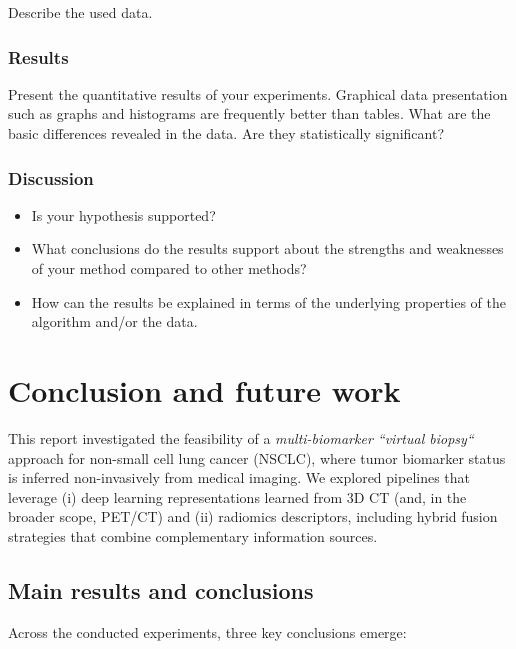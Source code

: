 \documentclass[twoside,runningheads,a4paper,11pt]{report}
\begin{document}
Describe the used data.

\subsection{Results}
\label{section:results}

Present the quantitative results of your experiments. Graphical data presentation such as graphs and histograms are frequently better than tables. What are the basic differences revealed in the data. Are they statistically significant?

\subsection{Discussion}
\label{section:discussion}

\begin{itemize}
	\item Is your hypothesis supported? 
	\item What conclusions do the results support about the strengths and weaknesses of your method compared to other methods? 
	\item How can the results be explained in terms of the underlying properties of the algorithm and/or the data. 
\end{itemize}



\chapter{Conclusion and future work}
\label{chapter:concl}

This report investigated the feasibility of a \textit{multi-biomarker ``virtual biopsy``} approach for non-small cell lung cancer (NSCLC), where tumor biomarker status is inferred non-invasively from medical imaging. We explored pipelines that leverage (i) deep learning representations learned from 3D CT (and, in the broader scope, PET/CT) and (ii) radiomics descriptors, including hybrid fusion strategies that combine complementary information sources.

\section{Main results and conclusions}
Across the conducted experiments, three key conclusions emerge:
\end{document}
